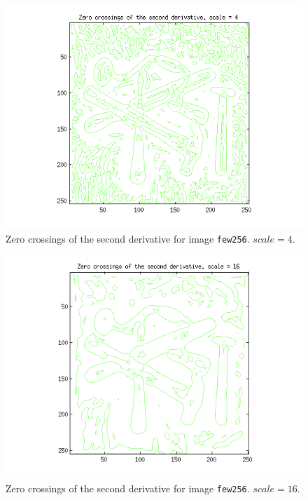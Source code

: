\begin{figure}[H]
	\centering
	\includegraphics[scale=0.8]{./images/Q5/vv/4.png}
	\caption{Zero crossings of the second derivative for image \texttt{few256}. $scale = 4$.}
	\label{fig:Q5_vv_4}
\end{figure}

\begin{figure}[H]
	\centering
	\includegraphics[scale=0.8]{./images/Q5/vv/16.png}
	\caption{Zero crossings of the second derivative for image \texttt{few256}. $scale = 16$.}
	\label{fig:Q5_vv_16}
\end{figure}

